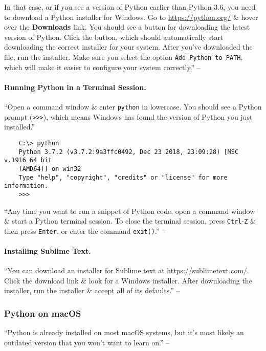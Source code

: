 \documentclass[oneside]{book}
\numberwithin{equation}{section}
\begin{document}
In that case, or if you see a version of Python earlier than Python 3.6, you need to download a Python installer for Windows. Go to \url{https://python.org/} \& hover over the \textbf{Downloads} link. You should see a button for downloading the latest version of Python. Click the button, which should automatically start downloading the correct installer for your system. After you've downloaded the file, run the installer. Make sure you select the option \texttt{Add Python to PATH}, which will make it easier to configure your system correctly.'' -- \cite[pp. 5--6]{Matthes2019}

\paragraph{Running Python in a Terminal Session.} ``Open a command window \& enter \texttt{python} in lowercase. You should see a Python prompt (\texttt{>>>}), which means Windows has found the version of Python you just installed.''

\begin{verbatim}
	C:\> python
	Python 3.7.2 (v3.7.2:9a3ffc0492, Dec 23 2018, 23:09:28) [MSC v.1916 64 bit
	(AMD64)] on win32
	Type "help", "copyright", "credits" or "license" for more information.
	>>>
\end{verbatim}
``Any time you want to run a snippet of Python code, open a command window \& start a Python terminal session. To close the terminal session, press \texttt{Ctrl}-\texttt{Z} \& then press \texttt{Enter}, or enter the command \texttt{exit()}.'' -- \cite[p. 6]{Matthes2019}

\paragraph{Installing Sublime Text.} ``You can download an installer for Sublime text at \url{https://sublimetext.com/}. Click the download link \& look for a Windows installer. After downloading the installer, run the installer \& accept all of its defaults.'' -- \cite[p. 7]{Matthes2019}

\subsubsection{Python on macOS}
``Python is already installed on most macOS systems, but it's most likely an outdated version that you won't want to learn on.'' -- \cite[p. 7]{Matthes2019}
\end{document}
